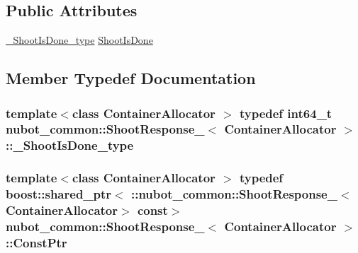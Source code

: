 \subsection*{Public Attributes}
\begin{DoxyCompactItemize}
\item 
\hyperlink{structnubot__common_1_1ShootResponse___ae0d76787507c62fb03e4e41e8de1b69a}{\-\_\-\-Shoot\-Is\-Done\-\_\-type} \hyperlink{structnubot__common_1_1ShootResponse___aa2de339585d1e01374d7227f1c9e84f6}{Shoot\-Is\-Done}
\end{DoxyCompactItemize}


\subsection{Member Typedef Documentation}
\hypertarget{structnubot__common_1_1ShootResponse___ae0d76787507c62fb03e4e41e8de1b69a}{
\subsubsection[{\-\_\-\-Shoot\-Is\-Done\-\_\-type}]{\setlength{\rightskip}{0pt plus 5cm}template$<$class Container\-Allocator $>$ typedef int64\-\_\-t {\bf nubot\-\_\-common\-::\-Shoot\-Response\-\_\-}$<$ Container\-Allocator $>$\-::{\bf \-\_\-\-Shoot\-Is\-Done\-\_\-type}}}\label{structnubot__common_1_1ShootResponse___ae0d76787507c62fb03e4e41e8de1b69a}
\hypertarget{structnubot__common_1_1ShootResponse___a5b955c6b595bd7dde539a7642782f213}{
\subsubsection[{Const\-Ptr}]{\setlength{\rightskip}{0pt plus 5cm}template$<$class Container\-Allocator $>$ typedef boost\-::shared\-\_\-ptr$<$ \-::{\bf nubot\-\_\-common\-::\-Shoot\-Response\-\_\-}$<$Container\-Allocator$>$ const$>$ {\bf nubot\-\_\-common\-::\-Shoot\-Response\-\_\-}$<$ Container\-Allocator $>$\-::{\bf Const\-Ptr}}}\label{structnubot__common_1_1ShootResponse___a5b955c6b595bd7dde539a7642782f213}
